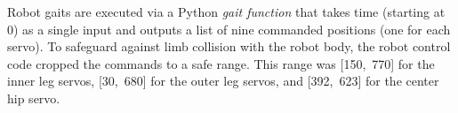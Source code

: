 Robot gaits are executed via a Python \emph{gait function} that takes time (starting at 0) as a single input and outputs a list of nine commanded positions (one for each servo).  To safeguard against limb collision with the robot body,
the robot control code cropped the commands to a safe range.  This
range was [150,~770] for the inner leg servos, [30,~680] for the outer
leg servos, and [392,~623] for the center hip servo.





